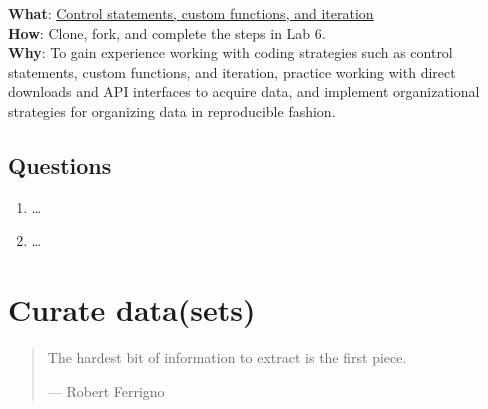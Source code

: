 \documentclass[
  letterpaper,
]{latex/krantz}
\providecommand{\tightlist}{%
  \setlength{\itemsep}{0pt}\setlength{\parskip}{0pt}}\usepackage{longtable,booktabs,array}
\begin{document}
\begin{tcolorbox}[enhanced jigsaw, toprule=.15mm, bottomtitle=1mm, coltitle=black, title=\textcolor{quarto-callout-tip-color}{\faLightbulb}\hspace{0.5em}{Lab}, left=2mm, colframe=quarto-callout-tip-color-frame, bottomrule=.15mm, colbacktitle=quarto-callout-tip-color!10!white, leftrule=.75mm, colback=white, titlerule=0mm, breakable, toptitle=1mm, opacityback=0, arc=.35mm, rightrule=.15mm, opacitybacktitle=0.6]

\textbf{What}: \href{https://github.com/lin380/lab_6}{Control
statements, custom functions, and iteration}\\
\textbf{How}: Clone, fork, and complete the steps in Lab 6.\\
\textbf{Why}: To gain experience working with coding strategies such as
control statements, custom functions, and iteration, practice working
with direct downloads and API interfaces to acquire data, and implement
organizational strategies for organizing data in reproducible fashion.

\end{tcolorbox}

\hypertarget{questions-4}{%
\section*{Questions}\label{questions-4}}


\begin{enumerate}
\def\labelenumi{\arabic{enumi}.}
\tightlist
\item
  \ldots{}
\item
  \ldots{}
\end{enumerate}

\hypertarget{sec-curate-datasets}{%
\chapter{Curate data(sets)}\label{sec-curate-datasets}}

\begin{quote}
The hardest bit of information to extract is the first piece.

--- Robert Ferrigno
\end{quote}
\end{document}
